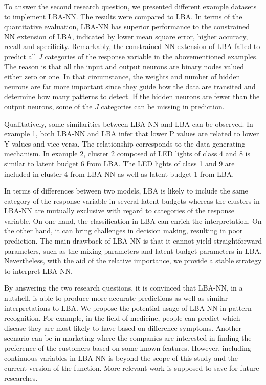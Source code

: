 \documentclass[]{interact}
\theoremstyle{plain}%
\theoremstyle{definition}
\theoremstyle{remark}
\begin{document}
To answer the second research question, we presented different example
datasets to implement LBA-NN. The results were compared to LBA. In terms
of the quantitative evaluation, LBA-NN has superior performance to the
constrained NN extension of LBA, indicated by lower mean square error,
higher accuracy, recall and specificity. Remarkably, the constrained NN
extension of LBA failed to predict all \(J\) categories of the response
variable in the abovementioned examples. The reason is that all the
input and output neurons are binary nodes valued either zero or one. In
that circumstance, the weights and number of hidden neurons are far more
important since they guide how the data are transited and determine how
many patterns to detect. If the hidden neurons are fewer than the output
neurons, some of the \(J\) categories can be missing in prediction.

Qualitatively, some similarities between LBA-NN and LBA can be observed.
In example 1, both LBA-NN and LBA infer that lower P values are related
to lower Y values and vice versa. The relationship corresponds to the
data generating mechanism. In example 2, cluster 2 composed of LED
lights of class 4 and 8 is similar to latent budget 6 from LBA. The LED
lights of class 1 and 9 are included in cluster 4 from LBA-NN as well as
latent budget 1 from LBA.

In terms of differences between two models, LBA is likely to include the
same category of the response variable in several latent budgets whereas
the clusters in LBA-NN are mutually exclusive with regard to categories
of the response variable. On one hand, the classification in LBA can
enrich the interpretation. On the other hand, it can bring challenges in
decision making, resulting in poor prediction. The main drawback of
LBA-NN is that it cannot yield straightforward parameters, such as the
mixing parameters and latent budget parameters in LBA. Nevertheless,
with the aid of the relative importance, we provide a stable strategy to
interpret LBA-NN.

By answering the two research questions, it is convinced that LBA-NN, in
a nutshell, is able to produce more accurate predictions as well as
similar interpretations to LBA. We propose the potential usage of LBA-NN
in pattern recognition. For example, in the field of medicine, people
can predict which disease they are most likely to have based on
difference symptoms. Another scenario can be in marketing where the
companies are interested in finding the preference of the customers
based on some known features. However, including continuous variables in
LBA-NN is beyond the scope of this study and the current version of the
function. More relevant work is supposed to save for future researches.



\end{document}
